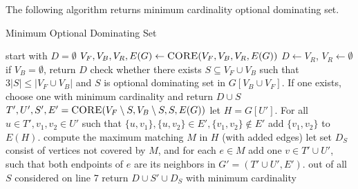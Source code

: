The following algorithm returns minimum cardinality optional dominating set. 
\begin{algorithm}
\caption{Minimum Optional Dominating Set}
\label{alg:mods}
\begin{algorithmic}[1]
 
\State start with $D = \emptyset$
\State $V_F, V_B, V_R, E(G) \gets \textsc{CORE}(V_F, V_B, V_R, E(G))$
\State $D \gets V_R$, $V_R \gets \emptyset$
\State if $V_B = \emptyset$, return $D$
\State check whether there exists $S \subseteq V_F \cup V_B$ such that $3|S| \leq |V_F \cup V_B|$ and $S$ is optional dominating set in $G[V_B \cup V_F]$. If one exists, choose one with minimum cardinality and return $D \cup S$
\State $T', U', S', E' = \textsc{CORE}(V_F \setminus S, V_B\setminus S, S, E(G))$
\State let $H = G[U']$. For all $u\in T', v_1, v_2 \in U'$ such that $\{u, v_1\}, \{u, v_2\} \in E', \{v_1, v_2\} \notin E'$ add $\{v_1, v_2\}$ to $E(H)$.
\State compute the maximum matching $M$ in $H$ (with added edges)
\State let set $D_S$ consist of vertices not covered by $M$, and for each $e \in M$ add one $v \in T' \cup U'$, such that both endpoints of $e$ are its neighbors in $G' = (T' \cup U', E')$.   
\EndFor 
\State out of all $S$ considered on line 7 return $D \cup S' \cup D_S$ with minimum cardinality
\EndProcedure
\end{algorithmic}
\end{algorithm}

